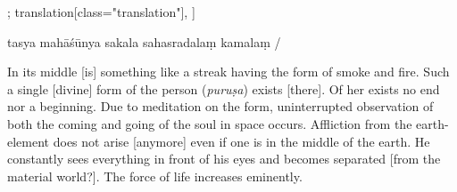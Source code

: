 \begin{alignment}[
  texts=edition[class="edition"];
  translation[class="translation"],
  ]
\begin{edition}
\begin{prose}
tasya mahāśūnya
sakala
sahasradalaṃ
kamalaṃ
/
\end{prose}
  \end{edition}
  \begin{translation}
    \begin{tlate}
      \noindent
In its middle [is] something like a streak having the form of smoke and fire. Such a single [divine] form of the person (\textit{puruṣa}) exists [there].\textsuperscript{} Of her exists no end nor a beginning. Due to meditation on the form, uninterrupted observation of both the coming and going of the soul in space occurs. Affliction from the earth-element does not arise [anymore] even if one is in the middle of the earth. He constantly sees everything in front of his eyes and becomes separated [from the material world?].\textsuperscript{\coro{[\lowroman{15}]}} The force of life increases eminently. 

\end{tlate}
\end{translation}
\end{alignment}
